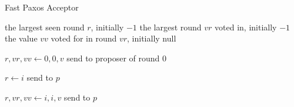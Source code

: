 \newcommand{\nullbot}{\textsf{null}}


\begin{algorithm}[ht]
  \caption{Fast Paxos Acceptor}%
  \begin{algorithmic}[1]
    \GlobalState the largest seen round $r$, initially $-1$ 
    \GlobalState the largest round $vr$ voted in, initially $-1$
    \GlobalState the value $vv$ voted for in round $vr$, initially \nullbot{}

     
        \State $r, vr, vv \gets 0, 0, v$
        \State send  to proposer of round $0$
      \EndIf
    \EndUpon{} 

      \State $r \gets i$
      \State send  to $p$
    \EndUpon {}

      \State $r, vr, vv \gets i, i, v$
      \State send  to $p$
    \EndUpon
  \end{algorithmic}
\end{algorithm}
